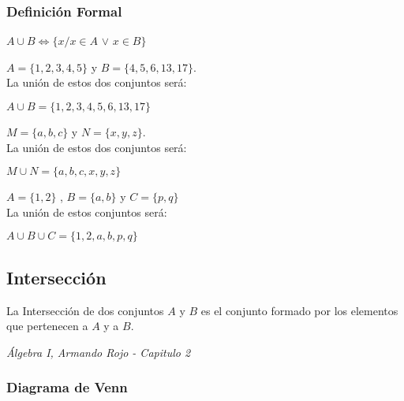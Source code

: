 \documentclass[12pt,a4paper]{book}
\newcommand*\ruleline[1]{\par\noindent\raisebox{.8ex}{\makebox[\linewidth]{\hrulefill\hspace{1ex}\raisebox{-.8ex}{#1}\hspace{1ex}\hrulefill}}}
\begin{document}
\subsubsection{Definición Formal}

\begin{center}
$A \cup B \Leftrightarrow \lbrace x/x \in A$ $\vee$ $x\in B \rbrace$
\end{center}

\ruleline{\textbf{Ejemplos}}
 $A = \lbrace 1,2,3,4,5 \rbrace$ y $B = \lbrace 4,5,6, 13,17 \rbrace$.\\ La unión de estos dos conjuntos será:
\begin{center}
$A \cup B = \lbrace 1,2,3,4,5,6,13,17 \rbrace$
\end{center}

 $M = \lbrace a,b,c \rbrace$ y $N = \lbrace x,y,z \rbrace$.\\ La unión de estos dos conjuntos será:
\begin{center}
$M \cup N = \lbrace a,b,c,x,y,z \rbrace$
\end{center}

 $A = \lbrace 1,2 \rbrace$ , $ B= \lbrace a,b \rbrace$ y $C = \lbrace p,q \rbrace$\\ La unión de estos conjuntos será:
\begin{center}
$A \cup B \cup C = \lbrace 1,2,a,b,p,q \rbrace$
\end{center}


\subsection{Intersección}
\begin{framed}\noindent
La Intersección de dos conjuntos $A$ y $B$ es el conjunto formado por los elementos que pertenecen a $A$ y a $B$.
\begin{flushright}
\textit{{\scriptsize Álgebra I, Armando Rojo - Capitulo 2}}
\end{flushright}
\vspace{-0.5cm}
\end{framed}
\subsubsection{Diagrama de Venn}
\begin{center}
\end{center}
\end{document}
